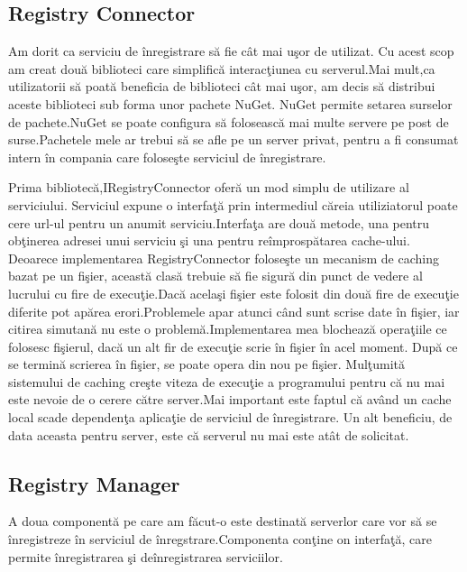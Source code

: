 \documentclass[a4paper,12pt]{report}
\begin{document}
\subsection{Registry Connector}

Am dorit ca serviciu de \^inregistrare s\u a fie c\^at mai u\c sor de utilizat.
Cu acest scop am creat dou\u a biblioteci care simplific\u a interac\c tiunea cu 
serverul.Mai mult,ca utilizatorii s\u a poat\u a beneficia de biblioteci c\^at mai 
u\c sor, am decis s\u a distribui aceste biblioteci sub forma unor pachete NuGet.
NuGet permite setarea surselor de pachete.NuGet se poate configura s\u a foloseasc\u a
mai multe servere pe post de surse.Pachetele mele ar trebui s\u a se afle pe un server 
privat, pentru a fi consumat intern \^in compania care folose\c ste serviciul de \^inregistrare.

Prima bibliotec\u a,IRegistryConnector ofer\u a un mod simplu de utilizare al serviciului.
Serviciul expune o interfa\c t\u a prin intermediul c\u areia utiliziatorul poate
cere url-ul pentru un anumit serviciu.Interfa\c ta are dou\u a metode, una pentru ob\c tinerea
adresei unui serviciu \c si una pentru re\^improsp\u atarea cache-ului.
Deoarece implementarea RegistryConnector folose\c ste un mecanism de caching bazat pe un fi\c sier,
aceast\u a clas\u a trebuie s\u a fie sigur\u a din punct de vedere al lucrului
cu fire de execu\c tie.Dac\u a acela\c si fi\c sier este folosit din dou\u a fire de execu\c tie 
diferite pot ap\u area erori.Problemele apar atunci c\^and sunt scrise date \^in fi\c sier,
iar citirea simutan\u a nu este o problem\u a.Implementarea mea blocheaz\u a opera\c tiile 
ce folosesc fi\c sierul, dac\u a un alt fir de execu\c tie scrie \^in fi\c sier \^in acel moment.
Dup\u a ce se termin\u a scrierea \^in fi\c sier, se poate opera din nou pe fi\c sier.
Mul\c tumit\u a sistemului de caching cre\c ste viteza de execu\c tie a programului pentru
c\u a nu mai este nevoie de o cerere c\u atre server.Mai important este faptul c\u a
av\^and un cache local scade dependen\c ta aplica\c tie de serviciul de \^inregistrare.
Un alt beneficiu, de data aceasta pentru server, este c\u a serverul nu mai este at\^at de 
solicitat.

\subsection{Registry Manager}

A doua component\u a pe care am f\u acut-o este destinat\u a serverlor care vor s\u a se 
\^inregistreze \^in serviciul de \^inregstrare.Componenta con\c tine on interfa\c t\u a,
care permite \^inregistrarea \c si de\^inregistrarea serviciilor.
\end{document}
